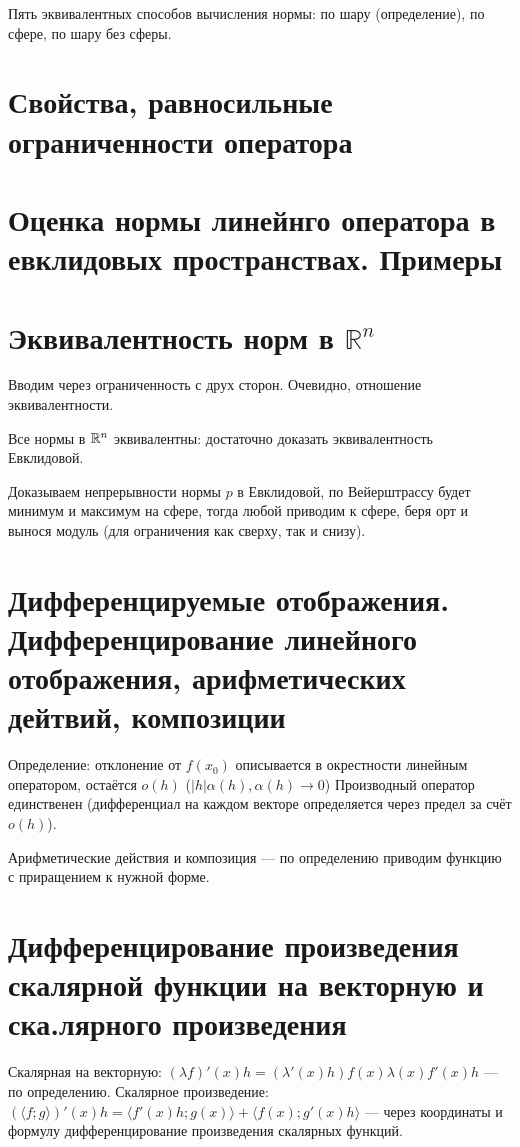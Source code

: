 \documentclass[12pt, a4paper]{article}
\begin{document}
    Пять эквивалентных способов вычисления нормы: по шару (определение), по сфере, по шару без сферы.

\section{Свойства, равносильные ограниченности оператора}
\section{Оценка нормы линейнго оператора в евклидовых пространствах. Примеры}
\section{Эквивалентность норм в $\mathbb{R}^{n}$}

    Вводим через ограниченность с друх сторон. Очевидно, отношение эквивалентности.

    Все нормы в ${\mathbb{R}}^n$ эквивалентны: достаточно доказать эквивалентность Евклидовой. 

    Доказываем непрерывности нормы $p$ в Евклидовой, по Вейерштрассу будет минимум и максимум на сфере, 
    тогда любой приводим к сфере, беря орт и вынося модуль (для ограничения как сверху, так и снизу).

\section{Дифференцируемые отображения. Дифференцирование линейного отображения, арифметических дейтвий, композиции}

    Определение: отклонение от $f(x_0)$ описывается в окрестности линейным оператором, остаётся $o(h)$ ($|h| \alpha(h), \alpha(h) → 0$)
    Производный оператор единственен (дифференциал на каждом векторе определяется через предел за счёт $o(h)$).

    Арифметические действия и композиция — по определению приводим функцию с приращением к нужной форме.

\section{Дифференцирование произведения скалярной функции на векторную и ска.лярного произведения}

    Скалярная на векторную: $(\lambda f)'(x) h = (\lambda'(x)h)f(x) \lambda(x)f'(x) h$ — по определению.
    Скалярное произведение: $(\langle f; g \rangle)'(x) h = \langle f'(x)h; g(x) \rangle + \langle f(x); g'(x)h \rangle$ 
    — через координаты и формулу дифференцирование произведения скалярных функций.
\end{document}

